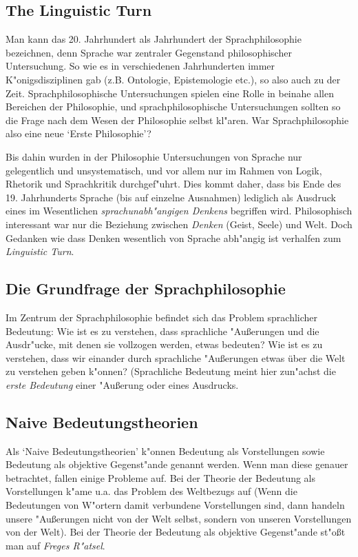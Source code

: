 \documentclass[emulatestandardclasses]{scrartcl}
\begin{document}
\subsection{The Linguistic Turn}

Man kann das 20. Jahrhundert als Jahrhundert der Sprachphilosophie bezeichnen, denn Sprache war zentraler Gegenstand philosophischer Untersuchung. So wie es in verschiedenen Jahrhunderten  immer K"onigsdisziplinen gab (z.B. Ontologie, Epistemologie etc.), so also auch zu der Zeit. Sprachphilosophische Untersuchungen spielen eine Rolle in beinahe allen Bereichen der Philosophie, und sprachphilosophische Untersuchungen sollten so die Frage nach dem Wesen der Philosophie selbst kl"aren. War Sprachphilosophie also eine neue `Erste Philosophie'?

Bis dahin wurden in der Philosophie Untersuchungen von Sprache nur gelegentlich und unsystematisch, und vor allem nur im Rahmen von Logik, Rhetorik und Sprachkritik durchgef"uhrt. Dies kommt daher, dass bis Ende des 19. Jahrhunderts Sprache (bis auf einzelne Ausnahmen) lediglich als Ausdruck eines im Wesentlichen \emph{sprachunabh"angigen Denkens} begriffen wird. Philosophisch interessant war nur die Beziehung zwischen \emph{Denken} (Geist, Seele) und Welt. Doch Gedanken wie dass Denken wesentlich von Sprache abh"angig ist verhalfen zum \emph{Linguistic Turn}.


\subsection{Die Grundfrage der Sprachphilosophie}

Im Zentrum der Sprachphilosophie befindet sich das Problem sprachlicher Bedeutung: Wie ist es zu verstehen, dass sprachliche "Au\ss erungen und die Ausdr"ucke, mit denen sie vollzogen werden, etwas bedeuten? Wie ist es zu verstehen, dass wir einander durch sprachliche "Au\ss erungen etwas über die Welt zu verstehen geben k"onnen? (Sprachliche Bedeutung meint hier zun"achst die \emph{erste Bedeutung} einer "Au\ss erung oder eines Ausdrucks.

\subsection{Naive Bedeutungstheorien}

Als `Naive Bedeutungstheorien' k"onnen Bedeutung als Vorstellungen sowie Bedeutung als objektive Gegenst"ande genannt werden. Wenn man diese genauer betrachtet, fallen einige Probleme auf. Bei der Theorie der Bedeutung als Vorstellungen k"ame u.a. das Problem des Weltbezugs auf (Wenn die Bedeutungen von W"ortern damit verbundene Vorstellungen sind, dann handeln unsere "Au\ss erungen nicht von der Welt selbst, sondern von unseren Vorstellungen von der Welt). Bei der Theorie der Bedeutung als objektive Gegenst"ande st"o\ss t man auf \emph{Freges R"atsel}. \\
\end{document}
